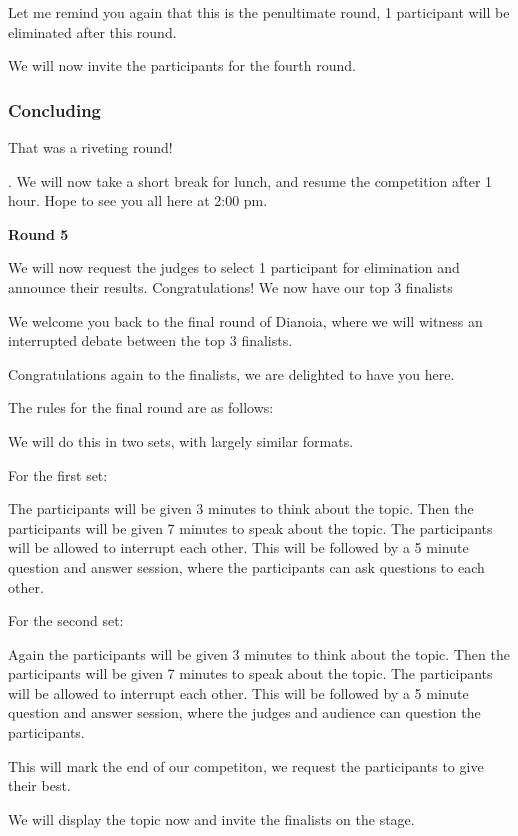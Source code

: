 \documentclass{report}
\begin{document}
Let me remind you again that this is the penultimate round, 1 participant will be eliminated after this round.

We will now invite the participants for the fourth round.

\subsubsection*{Concluding}
That was a riveting round! 

.
We will now take a short break for lunch, and resume the competition after 1 hour.
Hope to see you all here at 2:00 pm.


\begin{center}
    \large
    \textbf{Round 5}
\end{center}



We will now request the judges to select 1 participant for elimination and announce their results.
Congratulations! We now have our top 3 finalists

We welcome you back to the final round of Dianoia, 
where we will witness an interrupted debate between the top 3 finalists.

Congratulations again to the finalists, we are delighted to have you here.

The rules for the final round are as follows:

We will do this in two sets, with largely similar formats.

For the first set:

The participants will be given 3 minutes to think about the topic.
Then the participants will be given 7 minutes to speak about the topic. The participants will be allowed to interrupt each other.
This will be followed by a 5 minute question and answer session, where the participants can ask questions to each other.

For the second set:

Again the participants will be given 3 minutes to think about the topic.
Then the participants will be given 7 minutes to speak about the topic. The participants will be allowed to interrupt each other.
This will be followed by a 5 minute question and answer session, where the judges and audience can question the participants.

This will mark the end of our competiton, we request the participants to give their best. 

We will display the topic now and invite the finalists on the stage.
\end{document}
